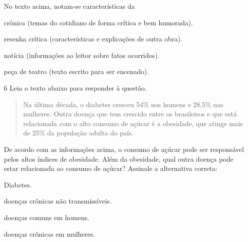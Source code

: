 No texto acima, notam-se características da

\begin{escolha}

    \item crônica (temas do cotidiano de forma crítica e bem humorada).

    \item resenha crítica (características e explicações de outra obra).

    \item notícia (informações ao leitor sobre fatos ocorridos).

    \item peça de teatro (texto escrito para ser encenado). 

\end{escolha}

\num{6} Leia o texto abaixo para responder à questão. 

\begin{quote}

Na última década, o diabetes cresceu 54\% nos homens e 28,5\% nas
mulheres. Outra doença que tem crescido entre os brasileiros e que está
relacionada com o alto consumo de açúcar é a obesidade, que atinge
mais de 25\% da população adulta do país.

\end{quote}


De acordo com as informações acima, o consumo de açúcar pode ser
responsável pelos altos índices de obesidade. Além da obesidade, qual
outra doença pode estar relacionada ao consumo de açúcar? Assinale a
alternativa correta:

\begin{escolha}

  \item Diabetes.
  
  \item doenças crônicas não transmissíveis.
  
  \item doenças comuns em homens.
  
  \item doenças crônicas em mulheres. 

\end{escolha}

